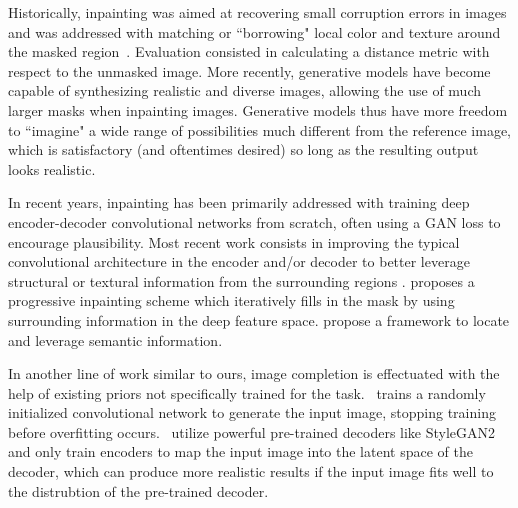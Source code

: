 Historically, inpainting was aimed at recovering small corruption errors in images and 
was addressed with matching or ``borrowing" local color and texture around the masked
 region~\citep{poisson, patch_based}. Evaluation consisted in calculating a distance
  metric with respect to the unmasked image. More recently, generative models have 
  become capable of synthesizing realistic and diverse images, allowing the use of much
   larger masks when inpainting images. Generative models thus have more freedom 
   to ``imagine" a wide range of possibilities much different from the reference image,
    which is satisfactory (and oftentimes desired) so long as the resulting output looks
     realistic. 

In recent years, inpainting has been primarily addressed with training deep 
encoder-decoder convolutional networks from scratch, often using a 
GAN\citep{goodfellowgans} loss to encourage plausibility. Most recent work consists in 
improving the typical convolutional architecture in the encoder and/or decoder to better
 leverage structural or textural information from the surrounding regions 
 \cite{lama, hong2019deep, yu2020region, hukkelaas2020image, yang2020learning, zhu2021image, liu2018image, ma2022regionwise, zheng2022cm}. 
 \cite{li2020recurrent} proposes a progressive inpainting scheme which iteratively 
 fills in the mask by using surrounding information in the deep feature space.  
 \cite{xiong2019foreground, liao2020guidance} propose a framework to locate and 
 leverage semantic information.



In another line of work similar to ours, image completion is effectuated with the 
help of existing priors not specifically trained for the task.~\cite{ulyanov2018deep} 
trains a randomly initialized convolutional network to generate the input image, 
stopping training before overfitting occurs.~\cite{psp, zhao2021comodgan, glean} 
utilize powerful pre-trained decoders like StyleGAN2~\citep{karra2020stylegan2} and only train
 encoders to map the input image into the latent space of the decoder, which can produce
  more realistic results if the input image fits well to the distrubtion of the
   pre-trained decoder. 




